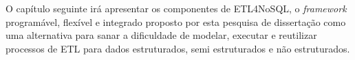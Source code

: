 O capítulo seguinte irá apresentar os componentes de ETL4NoSQL, o \textit{framework} programável, flexível e integrado proposto por esta pesquisa de dissertação como uma alternativa para sanar a dificuldade de modelar, executar e reutilizar processos de ETL para dados estruturados, semi estruturados e não estruturados.

